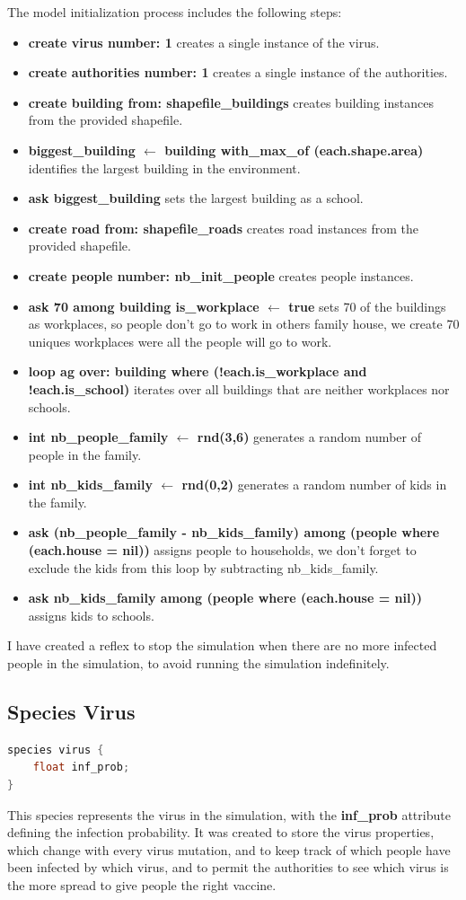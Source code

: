 \documentclass{article}
\begin{document}
The model initialization process includes the following steps:
\begin{itemize}
    \item \textbf{create virus number: 1} creates a single instance of the virus.
    \item \textbf{create authorities number: 1} creates a single instance of the authorities.
    \item \textbf{create building from: shapefile\_buildings} creates building instances from the provided shapefile.
    \item \textbf{biggest\_building $\leftarrow$ building with\_max\_of (each.shape.area)} identifies the largest building in the environment.
    \item \textbf{ask biggest\_building} sets the largest building as a school.
    \item \textbf{create road from: shapefile\_roads} creates road instances from the provided shapefile.
    \item \textbf{create people number: nb\_init\_people} creates people instances.
    \item \textbf{ask 70 among building {is\_workplace $\leftarrow$ true}} sets 70 of the buildings as workplaces, so people don't go to work in others family house, we create 70 uniques workplaces were all the people will go to work.
    \item \textbf{loop ag over: building where (!each.is\_workplace and !each.is\_school)} iterates over all buildings that are neither workplaces nor schools.
    \item \textbf{int nb\_people\_family $\leftarrow$ rnd(3,6)} generates a random number of people in the family.
    \item \textbf{int nb\_kids\_family $\leftarrow$ rnd(0,2)} generates a random number of kids in the family.
    \item \textbf{ask (nb\_people\_family - nb\_kids\_family) among (people where (each.house = nil))} assigns people to households, we don't forget to exclude the kids from this loop by subtracting nb\_kids\_family.
    \item \textbf{ask nb\_kids\_family among (people where (each.house = nil))} assigns kids to schools.
\end{itemize}
I have created a reflex to stop the simulation when there are no more infected people in the simulation, to avoid running the simulation indefinitely.

\subsection{Species Virus}
\begin{lstlisting}[language=Java, caption={Species Virus in GAML}]
species virus {
    float inf_prob;
}
\end{lstlisting}
This species represents the virus in the simulation, with the \textbf{inf\_prob} attribute defining the infection probability. It was created to store the virus properties, which change with every virus mutation, and to keep track of which people have been infected by which virus, and to permit the authorities to see which virus is the more spread to give people the right vaccine.
\end{document}
